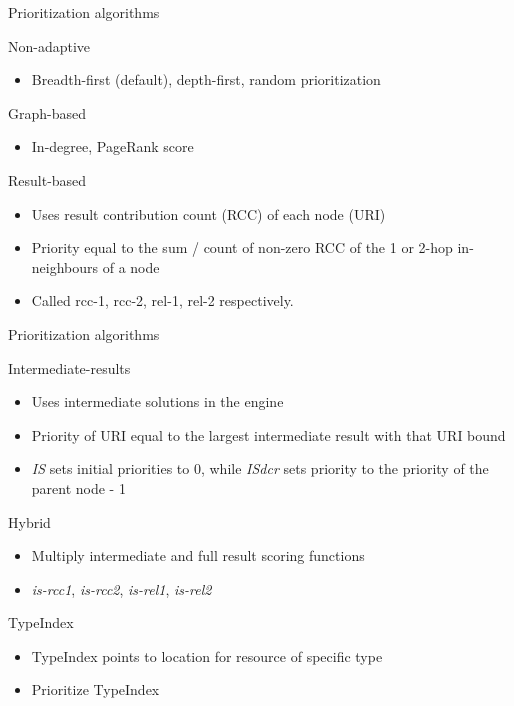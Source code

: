 
\begin{frame}{Prioritization algorithms \parencite{hartig2016walking}}
  \begin{block}{Non-adaptive}
    \begin{itemize}
        \item Breadth-first (default), depth-first, random prioritization
    \end{itemize}
  \end{block}
  \begin{block}{Graph-based}
        \begin{itemize}
        \item In-degree, PageRank score
    \end{itemize}
  \end{block}
  \begin{block}{Result-based}
        \begin{itemize}
        \item Uses result contribution count (RCC) of each node (URI)
        \item Priority equal to the sum / count of non-zero RCC of the 1 or 2-hop in-neighbours of a node
        \item Called rcc-1, rcc-2, rel-1, rel-2 respectively. 
    \end{itemize}
  \end{block}
\end{frame}

\begin{frame}{Prioritization algorithms}
  \begin{block}{Intermediate-results}
        \begin{itemize}
        \item Uses intermediate solutions in the engine
        \item Priority of URI equal to the largest intermediate result with that URI bound
        \item \emph{IS} sets initial priorities to 0, while \emph{ISdcr} sets priority to the priority of the parent node - 1
    \end{itemize}
  \end{block}
  \begin{block}{Hybrid}
        \begin{itemize}
        \item Multiply intermediate and full result scoring functions
        \item \emph{is-rcc1}, \emph{is-rcc2}, \emph{is-rel1}, \emph{is-rel2} 
    \end{itemize}
  \end{block}
  \begin{block}{TypeIndex}
        \begin{itemize}
        \item TypeIndex points to location for resource of specific type
        \item Prioritize TypeIndex
    \end{itemize}
  \end{block}
\end{frame}

